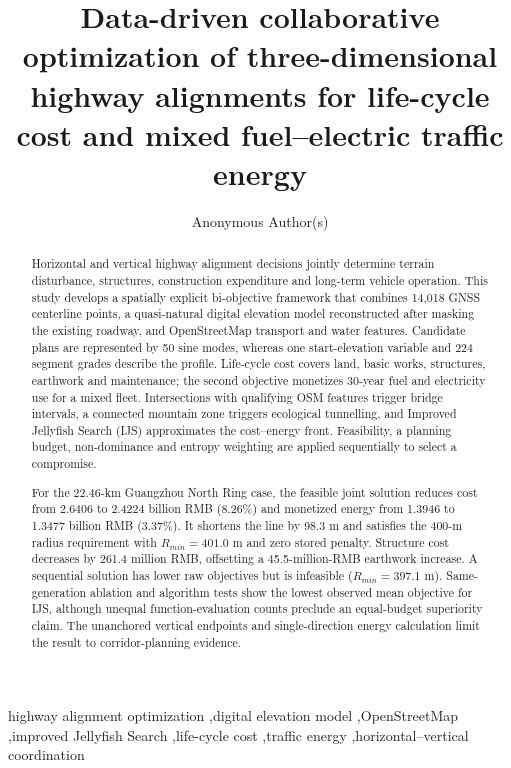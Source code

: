 \documentclass[preprint,12pt]{elsarticle}
\begin{document}
\begin{frontmatter}

\title{Data-driven collaborative optimization of three-dimensional highway alignments for life-cycle cost and mixed fuel--electric traffic energy}

\author[aff1]{Anonymous Author(s)}

\begin{abstract}
Horizontal and vertical highway alignment decisions jointly determine terrain disturbance, structures, construction expenditure and long-term vehicle operation. This study develops a spatially explicit bi-objective framework that combines 14,018 GNSS centerline points, a quasi-natural digital elevation model reconstructed after masking the existing roadway, and OpenStreetMap transport and water features. Candidate plans are represented by 50 sine modes, whereas one start-elevation variable and 224 segment grades describe the profile. Life-cycle cost covers land, basic works, structures, earthwork and maintenance; the second objective monetizes 30-year fuel and electricity use for a mixed fleet. Intersections with qualifying OSM features trigger bridge intervals, a connected mountain zone triggers ecological tunnelling, and Improved Jellyfish Search (IJS) approximates the cost--energy front. Feasibility, a planning budget, non-dominance and entropy weighting are applied sequentially to select a compromise.

For the 22.46-km Guangzhou North Ring case, the feasible joint solution reduces cost from 2.6406 to 2.4224 billion RMB (8.26\%) and monetized energy from 1.3946 to 1.3477 billion RMB (3.37\%). It shortens the line by 98.3 m and satisfies the 400-m radius requirement with $R_{min}=401.0$ m and zero stored penalty. Structure cost decreases by 261.4 million RMB, offsetting a 45.5-million-RMB earthwork increase. A sequential solution has lower raw objectives but is infeasible ($R_{min}=397.1$ m). Same-generation ablation and algorithm tests show the lowest observed mean objective for IJS, although unequal function-evaluation counts preclude an equal-budget superiority claim. The unanchored vertical endpoints and single-direction energy calculation limit the result to corridor-planning evidence.
\end{abstract}

\begin{keyword}
highway alignment optimization \sep digital elevation model \sep OpenStreetMap \sep improved Jellyfish Search \sep life-cycle cost \sep traffic energy \sep horizontal--vertical coordination
\end{keyword}
\end{frontmatter}
\end{document}
